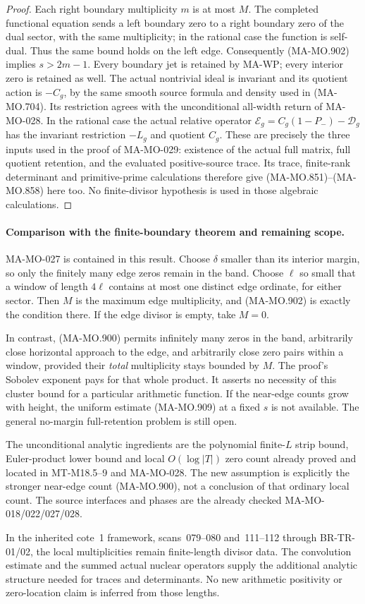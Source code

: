 \begin{proof}
Each right boundary multiplicity \(m\)
is at most \(M\). The completed
functional equation sends a left
boundary zero to a right boundary
zero of the dual sector, with the
same multiplicity; in the rational
case the function is self-dual.
Thus the same bound holds on the
left edge. Consequently (MA-MO.902)
implies \(s>2m-1\). Every boundary
jet is retained by MA-WP; every
interior zero is retained as well.
The actual nontrivial ideal is
invariant and its quotient action
is \(-C_g\), by the same smooth
source formula and density used
in (MA-MO.704). Its restriction
agrees with the unconditional
all-width return of MA-MO-028.
In the rational case the actual
relative operator
\(\mathscr E_g=C_g(1-P_-)-\mathscr D_g\)
has the invariant restriction
\(-L_g\) and quotient \(C_g\).
These are precisely the three
inputs used in the proof of
MA-MO-029: existence of the actual
full matrix, full quotient retention,
and the evaluated positive-source
trace. Its trace, finite-rank
determinant and primitive-prime
calculations therefore give
(MA-MO.851)--(MA-MO.858) here too.
No finite-divisor hypothesis is
used in those algebraic calculations.
\end{proof}

\paragraph{Comparison with the finite-boundary theorem and remaining scope.}
MA-MO-027 is contained in this result.
Choose \(\delta\) smaller than its
interior margin, so only the finitely
many edge zeros remain in the band.
Choose \(\ell\) so small that a
window of length \(4\ell\) contains
at most one distinct edge ordinate,
for either sector. Then \(M\) is
the maximum edge multiplicity, and
(MA-MO.902) is exactly the condition
there. If the edge divisor is empty,
take \(M=0\).

In contrast, (MA-MO.900) permits
infinitely many zeros in the band,
arbitrarily close horizontal
approach to the edge, and arbitrarily
close zero pairs within a window,
provided their \emph{total}
multiplicity stays bounded by \(M\).
The proof's Sobolev exponent pays
for that whole product. It asserts
no necessity of this cluster bound
for a particular arithmetic function.
If the near-edge counts grow with
height, the uniform estimate
(MA-MO.909) at a fixed \(s\) is not
available. The general no-margin
full-retention problem is still open.

The unconditional analytic ingredients
are the polynomial finite-\(L\)
strip bound, Euler-product lower
bound and local \(O(\log|T|)\)
zero count already proved and
located in MT-M18.5--9 and
MA-MO-028. The new assumption is
explicitly the stronger near-edge
count (MA-MO.900), not a conclusion
of that ordinary local count.
The source interfaces and phases
are the already checked
MA-MO-018/022/027/028.

In the inherited cote~1 framework,
scans~079--080 and~111--112 through
BR-TR-01/02, the local multiplicities
remain finite-length divisor data.
The convolution estimate and the
summed actual nuclear operators
supply the additional analytic
structure needed for traces and
determinants. No new arithmetic
positivity or zero-location claim
is inferred from those lengths.
